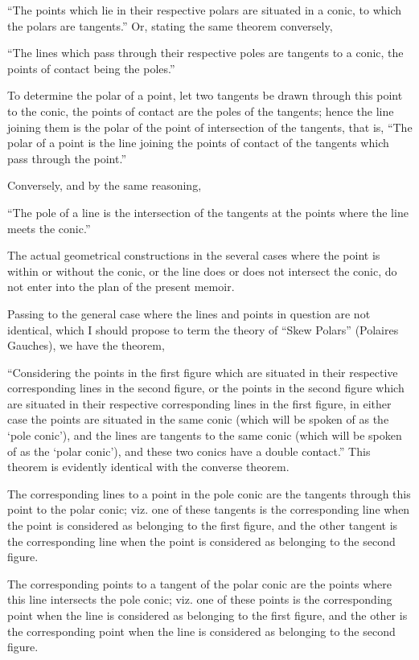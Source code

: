 \documentclass[11pt]{article}
\begin{document}
\medskip
``The points which lie in their respective polars are situated in a conic, to which
the polars are tangents.'' Or, stating the same theorem conversely,

\smallskip
``The lines which pass through their respective poles are tangents to a conic, the
points of contact being the poles.''

\medskip
To determine the polar of a point, let two tangents be drawn through this point to
the conic, the points of contact are the poles of the tangents; hence the line joining
them is the polar of the point of intersection of the tangents, that is, ``The polar of
a point is the line joining the points of contact of the tangents which pass through
the point.''

\medskip
Conversely, and by the same reasoning,

\smallskip
``The pole of a line is the intersection of the tangents at the points where the
line meets the conic.''

\medskip
The actual geometrical constructions in the several cases where the point is within
or without the conic, or the line does or does not intersect the conic, do not enter
into the plan of the present memoir.

\medskip
Passing to the general case where the lines and points in question are not identical,
which I should propose to term the theory of ``Skew Polars'' (Polaires Gauches), we
have the theorem,

\smallskip
``Considering the points in the first figure which are situated in their respective
corresponding lines in the second figure, or the points in the second figure which are
situated in their respective corresponding lines in the first figure, in either case the
points are situated in the same conic (which will be spoken of as the `pole conic'),
and the lines are tangents to the same conic (which will be spoken of as the `polar
conic'), and these two conics have a double contact.'' This theorem is evidently identical
with the converse theorem.

\medskip
The corresponding lines to a point in the pole conic are the tangents through
this point to the polar conic; viz. one of these tangents is the corresponding line
when the point is considered as belonging to the first figure, and the other tangent
is the corresponding line when the point is considered as belonging to the second figure.

\medskip
The corresponding points to a tangent of the polar conic are the points where
this line intersects the pole conic; viz. one of these points is the corresponding point
when the line is considered as belonging to the first figure, and the other is the
corresponding point when the line is considered as belonging to the second figure.
\end{document}
